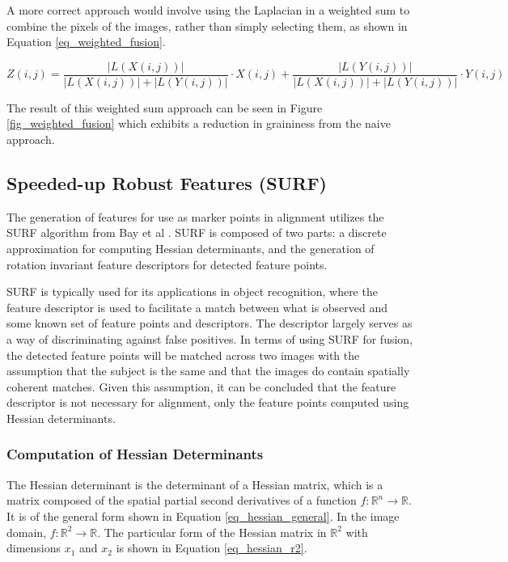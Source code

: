 \documentclass{article}
\begin{document}
A more correct approach would involve using the Laplacian in a weighted sum to combine the pixels of the images, rather than simply selecting them, as shown in Equation \ref{eq_weighted_fusion}.

\begin{equation}
Z(i,j) = \frac{|L(X(i,j))|}{|L(X(i,j))| + |L(Y(i,j))|} \cdot X(i,j) + \frac{|L(Y(i,j))|}{|L(X(i,j))| + |L(Y(i,j))|} \cdot Y(i,j)
\label{eq_weighted_fusion}
\end{equation}

The result of this weighted sum approach can be seen in Figure \ref{fig_weighted_fusion} which exhibits a reduction in graininess from the naive approach.

\subsection{Speeded-up Robust Features (SURF)}

The generation of features for use as marker points in alignment utilizes the SURF algorithm from Bay et al \cite{bay_surf:_2006}. SURF is composed of two parts: a discrete approximation for computing Hessian determinants, and the generation of rotation invariant feature descriptors for detected feature points. 

SURF is typically used for its applications in object recognition, where the feature descriptor is used to facilitate a match between what is observed and some known set of feature points and descriptors. The descriptor largely serves as a way of discriminating against false positives. In terms of using SURF for fusion, the detected feature points will be matched across two images with the assumption that the subject is the same and that the images do contain spatially coherent matches. Given this assumption, it can be concluded that the feature descriptor is not necessary for alignment, only the feature points computed using Hessian determinants.

\subsubsection{Computation of Hessian Determinants}

The Hessian determinant is the determinant of a Hessian matrix, which is a matrix composed of the spatial partial second derivatives of a function $f : \mathbb{R}^n \rightarrow \mathbb{R}$. It is of the general form shown in Equation \ref{eq_hessian_general}. In the image domain, $f : \mathbb{R}^2 \rightarrow \mathbb{R}$. The particular form of the Hessian matrix in $\mathbb{R}^2$ with dimensions $x_1$ and $x_2$ is shown in Equation \ref{eq_hessian_r2}.
\end{document}

